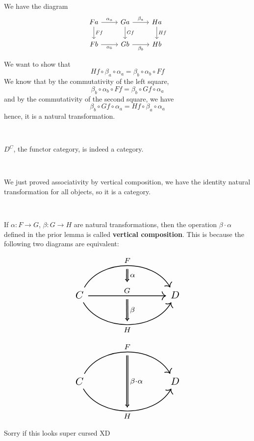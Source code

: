 \documentclass{article}
\begin{document}
\begin{customproof}
\

We have the diagram \[\begin{tikzcd}
    Fa & Ga & Ha\\
    Fb & Gb & Hb
    \arrow[from=1-1,to=1-2, "\alpha_a"]
    \arrow[from=1-2, to=1-3, "\beta_a"]
    \arrow[from=2-1, to=2-2, "\alpha_b"']
    \arrow[from=2-2, to=2-3, "\beta_b"']
    \arrow[from=1-1, to=2-1, "Ff"]
    \arrow[from=1-2, to=2-2, "Gf"]
    \arrow[from=1-3, to=2-3, "Hf"]
\end{tikzcd}\]

We want to show that $$Hf \circ \beta_a \circ \alpha_a = \beta_b \circ \alpha_b \circ Ff$$We know that by the commutativity of the left square,$$\beta_b \circ \alpha_b \circ Ff = \beta_b \circ Gf \circ \alpha_a$$and by the commutativity of the second square, we have $$\beta_b \circ Gf \circ \alpha_a = Hf \circ \beta_a \circ \alpha_a$$hence, it is a natural transformation.
\end{customproof}

\begin{corollary}
\

$D^C$, the functor category, is indeed a category.
\end{corollary}

\begin{customproof}
\

We just proved associativity by vertical composition, we have the identity natural transformation for all objects, so it is a category.
\end{customproof}

\begin{definition}
\

If $\alpha: F \to G$, $\beta: G \to H$ are natural transformations, then the operation $\beta \cdot \alpha$ defined in the prior lemma is called \textbf{vertical composition}. This is because the following two diagrams are equivalent:

\[
\begin{tikzcd}[
    column sep=4cm, 
    row sep=huge, 
    nodes={scale=1.5}, 
    every arrow/.append style={line width=1pt} 
]
    C & D
    \arrow[from=1-1, to=1-2, "G"{name=G}]
    \arrow[from=1-1, to=1-2, bend left = 60, "F"{name=F}]
    \arrow[from=1-1, to=1-2, bend right = 60, "H"'{name=H}]
    \arrow[Rightarrow, from=F, to=G, "\alpha", shorten <= 5pt, shorten >= 5pt]
    \arrow[Rightarrow, from=G, to=H, "\beta", shorten <= 5pt, shorten >= 5pt]
\end{tikzcd}
\]

\[
\begin{tikzcd}[
    column sep=4cm, 
    row sep=huge, 
    nodes={scale=1.5}, 
    every arrow/.append style={line width=1pt} 
]
    C & D
    \arrow[from=1-1, to=1-2, bend left = 60, "F"{name=F}]
    \arrow[from=1-1, to=1-2, bend right = 60, "H"'{name=H}]
    \arrow[Rightarrow, from=F, to=H, "\beta \cdot \alpha", shorten <= 5pt, shorten >= 5pt]
\end{tikzcd}
\]

Sorry if this looks super cursed XD
\end{definition}
\end{document}

